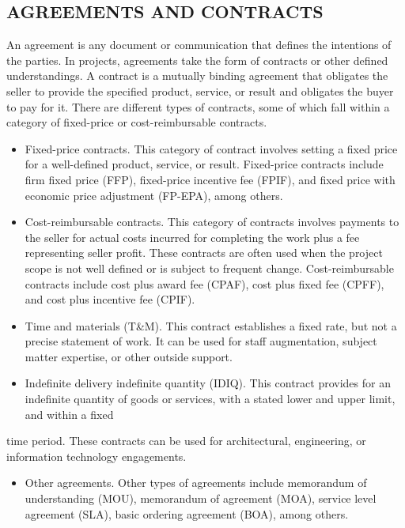 \documentclass[11pt]{article}
\begin{document}
\subsection{AGREEMENTS AND CONTRACTS}
\label{sec:org9cf030b}
An agreement is any document or communication that defines the intentions of the parties. In projects, agreements take the form of contracts or other defined understandings. A contract is
a mutually binding agreement that obligates the seller to provide the specified product, service, or result and obligates the buyer to pay for it. There are different types of contracts, some of which fall within a category of fixed-price or cost-reimbursable contracts.
\begin{itemize}
\item Fixed-price contracts. This category of contract involves setting a fixed price for a well-defined product, service, or result. Fixed-price contracts include firm fixed price (FFP), fixed-price incentive fee (FPIF), and fixed price with economic price adjustment (FP-EPA), among others.
\item Cost-reimbursable contracts. This category of contracts involves payments to the seller for actual costs incurred for completing the work plus a fee representing seller profit. These contracts are often used when the project scope is not well defined or is subject to frequent change. Cost-reimbursable contracts include cost plus award fee (CPAF), cost plus fixed fee (CPFF), and cost plus incentive fee (CPIF).
\item Time and materials (T\&M). This contract establishes a fixed rate, but not a precise statement of work. It can be used for staff augmentation, subject matter expertise, or other outside support.
\item Indefinite delivery indefinite quantity (IDIQ). This contract provides for an indefinite quantity of goods or services, with a stated lower and upper limit, and within a fixed
\end{itemize}
time period. These contracts can be used for architectural, engineering, or information technology engagements.
\begin{itemize}
\item Other agreements. Other types of agreements include memorandum of understanding (MOU), memorandum of agreement (MOA), service level agreement (SLA), basic ordering agreement (BOA), among others.
\end{itemize}
\end{document}
